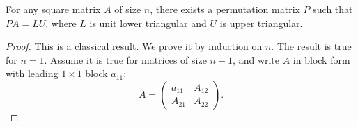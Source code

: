 \documentclass[final]{siamart1116}
\numberwithin{theorem}{section}
\begin{document}
\begin{theorem}\label{thm:row_permutation}
  For any square matrix $A$ of size $n$, there exists a permutation matrix $P$ such that $PA = LU$, where $L$ is unit lower triangular and $U$ is upper triangular.
\end{theorem}

\begin{proof}
  This is a classical result. We prove it by induction on $n$. The result is true for $n=1$. Assume it is true for matrices of size $n-1$, and write $A$ in block form with leading $1 \times 1$ block $a_{11}$:
  \[
    A =
    \begin{pmatrix}
      a_{11} & A_{12} \\
      A_{21} & A_{22}
    \end{pmatrix}.
  \]


\end{proof}
\end{document}
